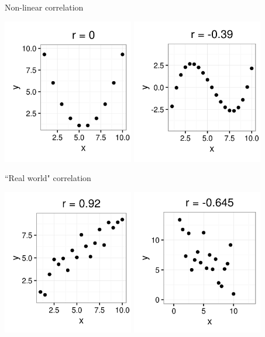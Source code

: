 \documentclass[xcolor=table]{beamer}
\begin{document}
\begin{frame}{Non-linear correlation}

{\centering
\includegraphics[width=2.25in]{../images/ch10_cor_para}
\pause\includegraphics[width=2.25in]{../images/ch10_cor_cube}
\par}
\end{frame}

\begin{frame}{``Real world" correlation}

{\centering
\includegraphics[width=2.25in]{../images/ch10_cor_pos3}
\pause\includegraphics[width=2.25in]{../images/ch10_cor_neg3}
\par}
\end{frame}
\end{document}
